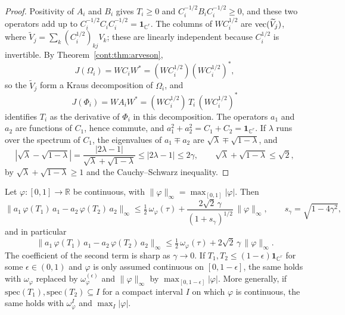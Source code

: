 \begin{proof}
Positivity of $A_i$ and $B_i$ gives $T_i\geq0$ and $C_i^{-1/2}B_iC_i^{-1/2}\geq0$, and these two operators add up to $C_i^{-1/2}C_iC_i^{-1/2}=\mathbf{1}_{\mathbb{C}^r}$. The columns of $WC_i^{1/2}$ are $\operatorname{vec}(\widetilde V_j)$, where $\widetilde V_j=\sum_k(C_i^{1/2})_{kj}V_k$; these are linearly independent because $C_i^{1/2}$ is invertible. By Theorem~\ref{cont:thm:arveson},
\[
J(\Omega_i)=WC_iW^*=(WC_i^{1/2})(WC_i^{1/2})^*,
\]
so the $\widetilde V_j$ form a Kraus decomposition of $\Omega_i$, and
\[
J(\Phi_i)=WA_iW^*=(WC_i^{1/2})\,T_i\,(WC_i^{1/2})^*
\]
identifies $T_i$ as the derivative of $\Phi_i$ in this decomposition. The operators $a_1$ and $a_2$ are functions of $C_1$, hence commute, and $a_1^2+a_2^2=C_1+C_2=\mathbf{1}_{\mathbb{C}^r}$. If $\lambda$ runs over the spectrum of $C_1$, the eigenvalues of $a_1\mp a_2$ are $\sqrt\lambda\mp\sqrt{1-\lambda}$, and
\[
|\sqrt\lambda-\sqrt{1-\lambda}|=\frac{|2\lambda-1|}{\sqrt\lambda+\sqrt{1-\lambda}}\leq|2\lambda-1|\leq2\gamma,\qquad\sqrt\lambda+\sqrt{1-\lambda}\leq\sqrt2,
\]
by $\sqrt\lambda+\sqrt{1-\lambda}\geq1$ and the Cauchy--Schwarz inequality.
\end{proof}

\begin{lemma}\label{cont:lem:sandwich}
Let $\varphi:[0,1]\to\mathbb{R}$ be continuous, with $\|\varphi\|_\infty=\max_{[0,1]}|\varphi|$. Then
\[
\big\|a_1\,\varphi(T_1)\,a_1-a_2\,\varphi(T_2)\,a_2\big\|_\infty\leq\tfrac12\,\omega_\varphi(\tau)+\frac{2\sqrt2\,\gamma}{(1+s_\gamma)^{1/2}}\,\|\varphi\|_\infty ,\qquad s_\gamma=\sqrt{1-4\gamma^2},
\]
and in particular
\[
\big\|a_1\,\varphi(T_1)\,a_1-a_2\,\varphi(T_2)\,a_2\big\|_\infty\leq\tfrac12\,\omega_\varphi(\tau)+2\sqrt2\,\gamma\,\|\varphi\|_\infty.
\]
The coefficient of the second term is sharp as $\gamma\to0$.
If $T_1,T_2\leq(1-\epsilon)\mathbf{1}_{\mathbb{C}^r}$ for some $\epsilon\in(0,1)$ and $\varphi$ is only assumed continuous on $[0,1-\epsilon]$, the same holds with $\omega_\varphi$ replaced by $\omega^{(\epsilon)}_\varphi$ and $\|\varphi\|_\infty$ by $\max_{[0,1-\epsilon]}|\varphi|$. More generally, if $\mathrm{spec}(T_1),\mathrm{spec}(T_2)\subseteq I$ for a compact interval $I$ on which $\varphi$ is continuous, the same holds with $\omega^I_\varphi$ and $\max_I|\varphi|$.
\end{lemma}

